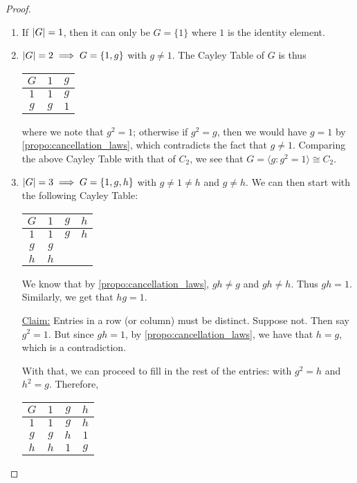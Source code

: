\documentclass[notoc,notitlepage]{tufte-book}
\begin{document}
\begin{proof}
  \begin{enumerate}
    \item If $\left|G\right| = 1$, then it can only be $G = \{1\}$ where $1$ is the identity element.
    \item $\left|G\right| = 2 \implies G = \{1, g\}$ with $g \neq 1$. The Cayley Table of $G$ is thus
      \begin{center}
        \begin{tabular}{c | c c}
        $G$ & $1$ & $g$ \\
        \hline
        $1$ & $1$ & $g$ \\
        $g$ & $g$ & $1$
        \end{tabular}
      \end{center}
      where we note that $g^2 = 1$; otherwise if $g^2 = g$, then we would have $g = 1$ by \autoref{propo:cancellation_laws}, which contradicts the fact that $g \neq 1$. Comparing the above Cayley Table with that of $C_2$, we see that $G = \langle g : g^2 = 1 \rangle \cong C_2$.
    \item $\left|G\right| = 3 \implies G = \{1, g, h\}$ with $g \neq 1 \neq h$ and $g \neq h$. We can then start with the following Cayley Table:
      \begin{center}
        \begin{tabular}{c | c c c}
        $G$ & $1$ & $g$ & $h$ \\
        \hline
        $1$ & $1$ & $g$ & $h$ \\
        $g$ & $g$ &     &     \\
        $h$ & $h$ &     &     
        \end{tabular}
      \end{center}
      We know that by \autoref{propo:cancellation_laws}, $gh \neq g$ and $gh \neq h$. Thus $gh = 1$. Similarly, we get that $hg = 1$.

      \underline{Claim:} Entries in a row (or column) must be distinct. Suppose not. Then say $g^2 = 1$. But since $gh = 1$, by \autoref{propo:cancellation_laws}, we have that $h = g$, which is a contradiction.

      With that, we can proceed to fill in the rest of the entries: with $g^2 = h$ and $h^2 = g$. Therefore,
      \begin{center}
        \begin{tabular}{c | c c c}
        $G$ & $1$ & $g$ & $h$ \\
        \hline
        $1$ & $1$ & $g$ & $h$ \\
        $g$ & $g$ & $h$ & $1$ \\
        $h$ & $h$ & $1$ & $g$
        \end{tabular}
      \end{center}


\end{enumerate}
\end{proof}
\end{document}
